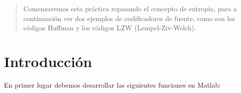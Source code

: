 \documentclass[es,practica]{uah}
\begin{document}

\maketitle

\begin{abstract}
Comenzaremos esta práctica repasando el concepto de entropía, para a continuación ver dos ejemplos de codificadores de fuente, como son los códigos Huffman y los códigos LZW (Lempel-Ziv-Welch). 
\end{abstract}

\section{Introducción}

En primer lugar debemos desarrollar las siguientes funciones en Matlab:
\end{document}
